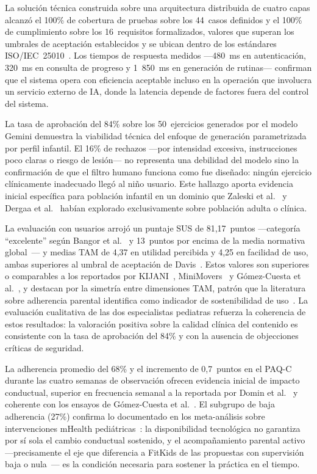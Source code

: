 			La solución técnica construida sobre una arquitectura distribuida de cuatro capas alcanzó el 100\% de cobertura de pruebas sobre los 44~casos definidos y el 100\% de cumplimiento sobre los 16~requisitos formalizados, valores que superan los umbrales de aceptación establecidos y se ubican dentro de los estándares ISO/IEC~25010~\cite{GuerreroUlloa2024}. Los tiempos de respuesta medidos ---480~ms en autenticación, 320~ms en consulta de progreso y 1~850~ms en generación de rutinas--- confirman que el sistema opera con eficiencia aceptable incluso en la operación que involucra un servicio externo de IA, donde la latencia depende de factores fuera del control del sistema.
			
			La tasa de aprobación del 84\% sobre los 50~ejercicios generados por el modelo Gemini demuestra la viabilidad técnica del enfoque de generación parametrizada por perfil infantil. El 16\% de rechazos ---por intensidad excesiva, instrucciones poco claras o riesgo de lesión--- no representa una debilidad del modelo sino la confirmación de que el filtro humano funciona como fue diseñado: ningún ejercicio clínicamente inadecuado llegó al niño usuario. Este hallazgo aporta evidencia inicial específica para población infantil en un dominio que Zaleski et al.~\cite{Zaleski2026} y Dergaa et al.~\cite{Dergaa2024} habían explorado exclusivamente sobre población adulta o clínica.
			
			La evaluación con usuarios arrojó un puntaje SUS de 81,17~puntos ---categoría ``excelente'' según Bangor et al.~\cite{Bangor2008} y 13~puntos por encima de la media normativa global~\cite{Lewis2018}--- y medias TAM de 4,37 en utilidad percibida y 4,25 en facilidad de uso, ambas superiores al umbral de aceptación de Davis~\cite{Davis1989}. Estos valores son superiores o comparables a los reportados por KIJANI~\cite{Willinger2024}, MiniMovers~\cite{Zhang2024} y Gómez-Cuesta et al.~\cite{GomezCuesta2024}, y destacan por la simetría entre dimensiones TAM, patrón que la literatura sobre adherencia parental identifica como indicador de sostenibilidad de uso~\cite{VegaDiaz2023,Yao2015}. La evaluación cualitativa de las dos especialistas pediatras refuerza la coherencia de estos resultados: la valoración positiva sobre la calidad clínica del contenido es consistente con la tasa de aprobación del 84\% y con la ausencia de objecciones críticas de seguridad.
			
			La adherencia promedio del 68\% y el incremento de 0,7~puntos en el PAQ-C~\cite{Kowalski2004,Benitez2016} durante las cuatro semanas de observación ofrecen evidencia inicial de impacto conductual, superior en frecuencia semanal a la reportada por Domin et al.~\cite{Domin2022} y coherente con los ensayos de Gómez-Cuesta et al.~\cite{GomezCuesta2024}. El subgrupo de baja adherencia (27\%) confirma lo documentado en los meta-análisis sobre intervenciones mHealth pediátricas~\cite{Schoeppe2017}: la disponibilidad tecnológica no garantiza por sí sola el cambio conductual sostenido, y el acompañamiento parental activo ---precisamente el eje que diferencia a FitKids de las propuestas con supervisión baja o nula~\cite{Papastergiou2021,MateoOrcajada2024}--- es la condición necesaria para sostener la práctica en el tiempo.
			
